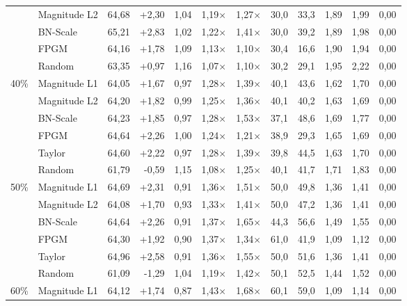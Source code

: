 \begin{table}[H]
{{\begin{tabular}{c l rr rrr rr rrr}
     & Magnitude L2 & 64,68 & +2,30 & 1,04 & 1,19$\times$ & 1,27$\times$ & 30,0 & 33,3 & 1,89 & 1,99 & 0,00 \\
     & BN-Scale & 65,21 & +2,83 & 1,02 & 1,22$\times$ & 1,41$\times$ & 30,0 & 39,2 & 1,89 & 1,98 & 0,00 \\
     & FPGM & 64,16 & +1,78 & 1,09 & 1,13$\times$ & 1,10$\times$ & 30,4 & 16,6 & 1,90 & 1,94 & 0,00 \\
     & Random & 63,35 & +0,97 & 1,16 & 1,07$\times$ & 1,10$\times$ & 30,2 & 29,1 & 1,95 & 2,22 & 0,00 \\
    \midrule
    \multirow{6}{*}{40\%} & Magnitude L1 & 64,05 & +1,67 & 0,97 & 1,28$\times$ & 1,39$\times$ & 40,1 & 43,6 & 1,62 & 1,70 & 0,00 \\
     & Magnitude L2 & 64,20 & +1,82 & 0,99 & 1,25$\times$ & 1,36$\times$ & 40,1 & 40,2 & 1,63 & 1,69 & 0,00 \\
     & BN-Scale & 64,23 & +1,85 & 0,97 & 1,28$\times$ & 1,53$\times$ & 37,1 & 48,6 & 1,69 & 1,77 & 0,00 \\
     & FPGM & 64,64 & +2,26 & 1,00 & 1,24$\times$ & 1,21$\times$ & 38,9 & 29,3 & 1,65 & 1,69 & 0,00 \\
     & Taylor & 64,60 & +2,22 & 0,97 & 1,28$\times$ & 1,39$\times$ & 39,8 & 44,5 & 1,63 & 1,70 & 0,00 \\
     & Random & 61,79 & -0,59 & 1,15 & 1,08$\times$ & 1,25$\times$ & 40,1 & 41,7 & 1,71 & 1,83 & 0,00 \\
    \midrule
    \multirow{6}{*}{50\%} & Magnitude L1 & 64,69 & +2,31 & 0,91 & 1,36$\times$ & 1,51$\times$ & 50,0 & 49,8 & 1,36 & 1,41 & 0,00 \\
     & Magnitude L2 & 64,08 & +1,70 & 0,93 & 1,33$\times$ & 1,41$\times$ & 50,0 & 47,2 & 1,36 & 1,41 & 0,00 \\
     & BN-Scale & 64,64 & +2,26 & 0,91 & 1,37$\times$ & 1,65$\times$ & 44,3 & 56,6 & 1,49 & 1,55 & 0,00 \\
     & FPGM & 64,30 & +1,92 & 0,90 & 1,37$\times$ & 1,34$\times$ & 61,0 & 41,9 & 1,09 & 1,12 & 0,00 \\
     & Taylor & 64,96 & +2,58 & 0,91 & 1,36$\times$ & 1,55$\times$ & 50,0 & 51,6 & 1,36 & 1,41 & 0,00 \\
     & Random & 61,09 & -1,29 & 1,04 & 1,19$\times$ & 1,42$\times$ & 50,1 & 52,5 & 1,44 & 1,52 & 0,00 \\
    \midrule
    \multirow{5}{*}{60\%} & Magnitude L1 & 64,12 & +1,74 & 0,87 & 1,43$\times$ & 1,68$\times$ & 60,1 & 59,0 & 1,09 & 1,14 & 0,00 \\

\end{tabular}}}
\end{table}
